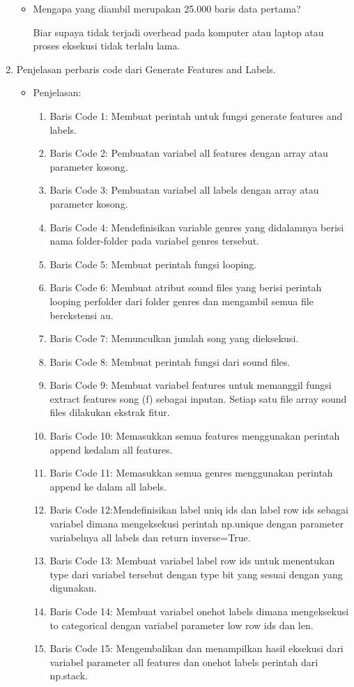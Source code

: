 \begin{enumerate}
\begin{itemize}
\item Mengapa yang diambil merupakan 25.000 baris data pertama?

Biar supaya tidak terjadi overhead pada komputer atau laptop atau proses eksekusi tidak terlalu lama.

\end{itemize}

\item Penjelasan perbaris code dari Generate Features and Labels.
\begin{itemize}

Code yang digunakan:


\item Penjelasan:
\begin{enumerate}
\item Baris Code 1: Membuat perintah untuk fungsi generate features and labels.
\item Baris Code 2: Pembuatan variabel all features dengan array atau parameter kosong.
\item Baris Code 3: Pembuatan variabel all labels dengan array atau parameter kosong.
\item Baris Code 4: Mendefinisikan variable genres yang didalamnya berisi nama folder-folder pada variabel genres tersebut.
\item Baris Code 5: Membuat perintah fungsi looping.
\item Baris Code 6: Membuat atribut sound files yang berisi perintah looping perfolder dari folder genres dan mengambil semua file berekstensi au.
\item Baris Code 7: Memunculkan jumlah song yang dieksekusi.
\item Baris Code 8: Membuat perintah fungsi dari sound files.
\item Baris Code 9: Membuat variabel features untuk memanggil fungsi extract features song (f) sebagai inputan. Setiap satu file array sound files dilakukan ekstrak fitur.
\item Baris Code 10: Memasukkan semua features menggunakan perintah append kedalam all features.
\item Baris Code 11: Memasukkan semua genres menggunakan perintah append ke dalam all labels.
\item Baris Code 12:Mendefinisikan label uniq ids dan label row ids sebagai variabel dimana mengeksekusi perintah np.unique dengan parameter variabelnya all labels dan return inverse=True.
\item Baris Code 13: Membuat variabel label row ids untuk menentukan type dari variabel tersebut dengan type bit yang sesuai dengan yang digunakan.
\item Baris Code 14: Membuat variabel onehot labels dimana mengeksekusi to categorical dengan variabel parameter low row ids dan len.
\item Baris Code 15: Mengembalikan dan menampilkan hasil eksekusi dari variabel parameter all features dan onehot labels perintah dari np.stack.
\end{enumerate}


\end{itemize}
\end{enumerate}
